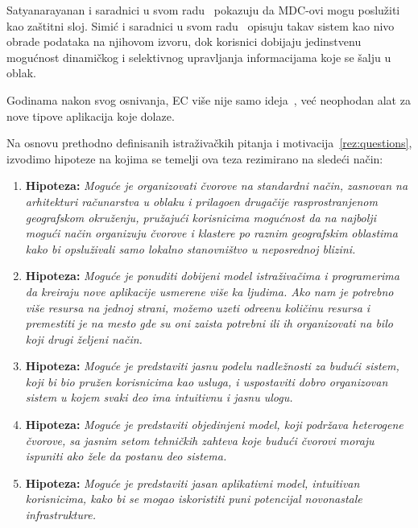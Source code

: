 Satyanarayanan i saradnici u svom radu~\cite{SatyanarayananK19} pokazuju da MDC-ovi mogu poslu\v ziti kao za\v stitni sloj. Simi\'c i saradnici u svom radu~\cite{inproceedingsSimic1}  opisuju takav sistem kao nivo obrade podataka na njihovom izvoru, dok korisnici dobijaju jedinstvenu mogu\'cnost dinami\v ckog i selektivnog upravljanja informacijama koje se \v salju u oblak. 

Godinama nakon svog osnivanja, EC vi\v se nije samo ideja~\cite{SatyanarayananK19}, ve\'c neophodan alat za nove tipove aplikacija koje dolaze.

Na osnovu prethodno definisanih istra\v ziva\v ckih pitanja i motivacija~\ref{rez:questions}, izvodimo hipoteze na kojima se temelji ova teza rezimirano na slede\'ci na\v cin:

\begin{enumerate}[start=1,label={(\bfseries \arabic*)}]
	\item \textbf{Hipoteza:} \textit{Mogu\'ce je organizovati \v cvorove na standardni na\v cin, zasnovan na arhitekturi ra\v cunarstva u oblaku i prilago\dj en druga\v cije rasprostranjenom geografskom okru\v zenju, pru\v zaju\'ci korisnicima mogu\'cnost da na najbolji mogu\'ci na\v cin organizuju \v cvorove i klastere po raznim geografskim oblastima kako bi opslu\v zivali samo lokalno stanovni\v stvo u neposrednoj blizini.}
	\item \textbf{Hipoteza:} \textit{Mogu\'ce je ponuditi dobijeni model istra\v ziva\v cima i programerima da kreiraju nove aplikacije usmerene vi\v se ka ljudima. Ako nam je potrebno vi\v se resursa na jednoj strani, mo\v zemo uzeti odre\dj enu koli\v cinu resursa i premestiti je na mesto gde su oni zaista potrebni ili ih organizovati na bilo koji drugi \v zeljeni na\v cin.}
	\item \textbf{Hipoteza:} \textit{Mogu\'ce je predstaviti jasnu podelu nadle\v znosti za budu\'ci sistem, koji bi bio pru\v zen korisnicima kao usluga, i uspostaviti dobro organizovan sistem u kojem svaki deo ima intuitivnu i jasnu ulogu.}
	\item \textbf{Hipoteza:} \textit{Mogu\'ce je predstaviti objedinjeni model, koji podr\v zava heterogene \v cvorove, sa jasnim setom tehni\v ckih zahteva koje budu\'ci \v cvorovi moraju ispuniti ako \v zele da postanu deo sistema.}
	\item \textbf{Hipoteza:} \textit{Mogu\'ce je predstaviti jasan aplikativni model, intuitivan korisnicima, kako bi se mogao iskoristiti puni potencijal novonastale infrastrukture.}
\end{enumerate}

